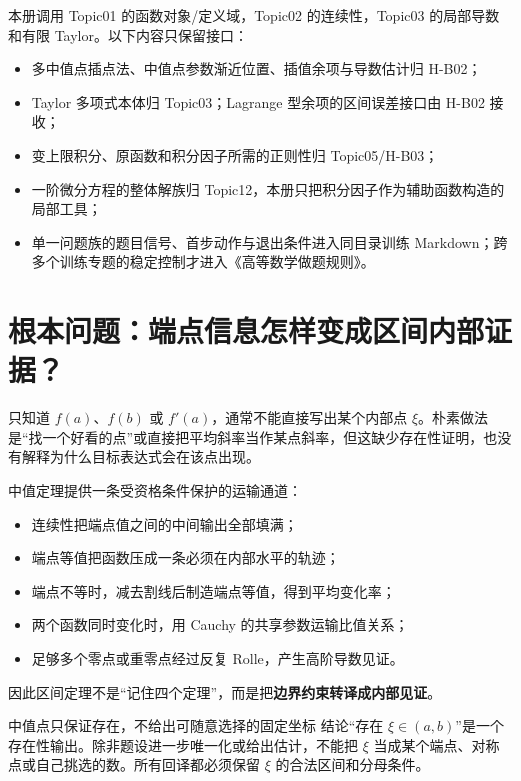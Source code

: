 \documentclass[UTF8,fontset=none,11pt,a4paper]{ctexart}
\begin{document}
本册调用 Topic01 的函数对象/定义域，Topic02 的连续性，Topic03 的局部导数和有限 Taylor。以下内容只保留接口：
\begin{itemize}
  \item 多中值点插点法、中值点参数渐近位置、插值余项与导数估计归 H-B02；
  \item Taylor 多项式本体归 Topic03；Lagrange 型余项的区间误差接口由 H-B02 接收；
  \item 变上限积分、原函数和积分因子所需的正则性归 Topic05/H-B03；
  \item 一阶微分方程的整体解族归 Topic12，本册只把积分因子作为辅助函数构造的局部工具；
  \item 单一问题族的题目信号、首步动作与退出条件进入同目录训练 Markdown；跨多个训练专题的稳定控制才进入《高等数学做题规则》。
\end{itemize}

\section{根本问题：端点信息怎样变成区间内部证据？}

只知道 $f(a)$、$f(b)$ 或 $f'(a)$，通常不能直接写出某个内部点 $\xi$。朴素做法是“找一个好看的点”或直接把平均斜率当作某点斜率，但这缺少存在性证明，也没有解释为什么目标表达式会在该点出现。

中值定理提供一条受资格条件保护的运输通道：
\begin{itemize}
  \item 连续性把端点值之间的中间输出全部填满；
  \item 端点等值把函数压成一条必须在内部水平的轨迹；
  \item 端点不等时，减去割线后制造端点等值，得到平均变化率；
  \item 两个函数同时变化时，用 Cauchy 的共享参数运输比值关系；
  \item 足够多个零点或重零点经过反复 Rolle，产生高阶导数见证。
\end{itemize}

因此区间定理不是“记住四个定理”，而是把\textbf{边界约束转译成内部见证}。

\begin{corebox}{中值点只保证存在，不给出可随意选择的固定坐标}
结论“存在 $\xi\in(a,b)$”是一个存在性输出。除非题设进一步唯一化或给出估计，不能把 $\xi$ 当成某个端点、对称点或自己挑选的数。所有回译都必须保留 $\xi$ 的合法区间和分母条件。
\end{corebox}
\end{document}
